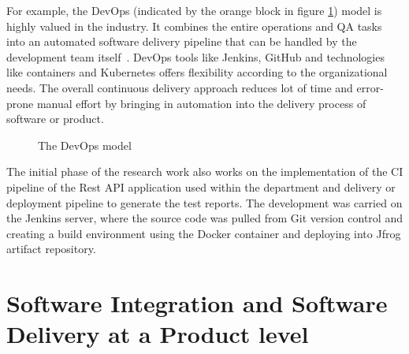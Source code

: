 For example, the DevOps (indicated by the orange block in figure \ref{fig:DevOps model}) model is highly valued in the industry. It combines the entire operations and QA tasks into an automated software delivery pipeline that can be handled by the development team itself~\parencite{leszko2017continuous}. DevOps tools like Jenkins, GitHub and technologies like containers and Kubernetes offers flexibility according to the organizational needs. The overall continuous delivery approach reduces lot of time and error-prone manual effort by bringing in automation into the delivery process of software or product.
\begin{figure}[H]
\caption[DevOps model]{The DevOps model\footnotemark}
\label{fig:DevOps model}
\end{figure}


The initial phase of the research work also works on the implementation of the \ac{CI} pipeline of the Rest API application used within the department and delivery or deployment pipeline to generate the test reports. The development was carried on the Jenkins server, where the source code was pulled from Git version control and creating a build environment using the Docker container and deploying into Jfrog artifact repository.


\section{Software Integration and Software Delivery at a Product level}\label{section:SoftwareIntegrationDeliveryProductLevel}

